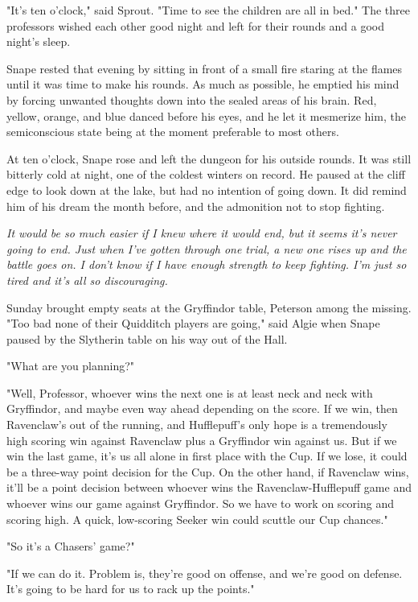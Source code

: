 "It's ten o'clock," said Sprout. "Time to see the children are all in bed." The three professors wished each other good night and left for their rounds and a good night's sleep.

Snape rested that evening by sitting in front of a small fire staring at the flames until it was time to make his rounds. As much as possible, he emptied his mind by forcing unwanted thoughts down into the sealed areas of his brain. Red, yellow, orange, and blue danced before his eyes, and he let it mesmerize him, the semiconscious state being at the moment preferable to most others.

At ten o'clock, Snape rose and left the dungeon for his outside rounds. It was still bitterly cold at night, one of the coldest winters on record. He paused at the cliff edge to look down at the lake, but had no intention of going down. It did remind him of his dream the month before, and the admonition not to stop fighting.

\emph{It would be so much easier if I knew where it would end, but it seems it's never going to end. Just when I've gotten through one trial, a new one rises up and the battle goes on. I don't know if I have enough strength to keep fighting. I'm just so tired and it's all so discouraging.}

Sunday brought empty seats at the Gryffindor table, Peterson among the missing. "Too bad none of their Quidditch players are going," said Algie when Snape paused by the Slytherin table on his way out of the Hall.

"What are you planning?"

"Well, Professor, whoever wins the next one is at least neck and neck with Gryffindor, and maybe even way ahead depending on the score. If we win, then Ravenclaw's out of the running, and Hufflepuff's only hope is a tremendously high scoring win against Ravenclaw plus a Gryffindor win against us. But if we win the last game, it's us all alone in first place with the Cup. If we lose, it could be a three-way point decision for the Cup. On the other hand, if Ravenclaw wins, it'll be a point decision between whoever wins the Ravenclaw-Hufflepuff game and whoever wins our game against Gryffindor. So we have to work on scoring and scoring high. A quick, low-scoring Seeker win could scuttle our Cup chances."

"So it's a Chasers' game?"

"If we can do it. Problem is, they're good on offense, and we're good on defense. It's going to be hard for us to rack up the points."

